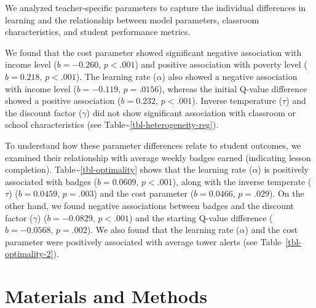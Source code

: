 \documentclass[
  number,
  preprint,
  3p,
  onecolumn]{elsarticle}
\begin{document}
We analyzed teacher-specific parameters to capture the individual
differences in learning and the relationship between model parameters,
classroom characteristics, and student performance metrics.

We found that the cost parameter showed significant negative association
with income level (\(b = -0.260\), \(p < .001\)) and positive
association with poverty level (\(b = 0.218\), \(p < .001\)). The
learning rate (\(\alpha\)) also showed a negative association with
income level (\(b = -0.119\), \(p = .0156\)), whereas the initial
Q-value difference showed a positive association (\(b = 0.232\),
\(p < .001\)). Inverse temperature (\(\tau\)) and the discount factor
(\(\gamma\)) did not show significant association with classroom or
school characteristics (see
Table\textasciitilde{}\ref{tbl-heterogeneity-reg}).

To understand how these parameter differences relate to student
outcomes, we examined their relationship with average weekly badges
earned (indicating lesson completion).
Table\textasciitilde{}\ref{tbl-optimality} shows that the learning rate
(\(\alpha\)) is positively associated with badges (\(b = 0.0609\),
\(p < .001\)), along with the inverse temperate (\(\tau\))
(\(b = 0.0459\), \(p = .003\)) and the cost parameter (\(b = 0.0466\),
\(p = .029\)). On the other hand, we found negative associations between
badges and the discount factor (\(\gamma\)) (\(b = -0.0829\),
\(p < .001\)) and the starting Q-value difference (\(b = -0.0568\),
\(p = .002\)). We also found that the learning rate (\(\alpha\)) and the
cost parameter were positively associated with average tower alerts (see
Table~\ref{tbl-optimality-2}).

\section{Materials and Methods}\label{materials-and-methods}
\end{document}
